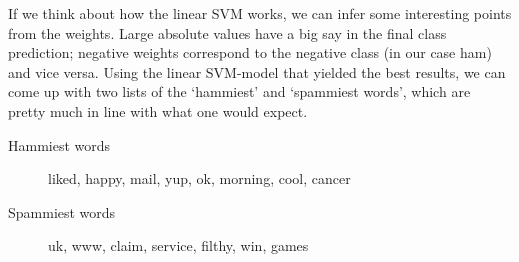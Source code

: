 \documentclass[runningheads,a4paper]{llncs}
\begin{document}
If we think about how the linear SVM works, we can infer some interesting points from the weights.\cite{stackoverflow}  Large absolute values have a big say in the final class prediction; negative weights correspond to the negative class (in our case ham) and vice versa. Using the linear SVM-model that yielded the best results, we can come up with two lists of the `hammiest' and `spammiest words', which are pretty much in line with what one would expect.
\begin{description}
\item[Hammiest words] liked, happy, mail, yup, ok, morning, cool, cancer
\item[Spammiest words] uk, www, claim, service, filthy, win, games
\end{description}



\end{document}
